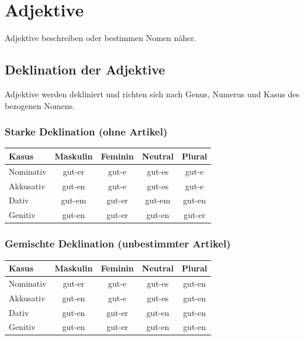 \chapter{Adjektive}
\label{cha:Adjektive}

Adjektive beschreiben oder bestimmen Nomen näher.

\section{Deklination der Adjektive}
\label{sec:AdjDeklination}

Adjektive werden dekliniert und richten sich nach Genus, Numerus und Kasus des bezogenen Nomens.

\subsection{Starke Deklination (ohne Artikel)}
\begin{center}
\begin{tabular}{|l|c|c|c|c|}
\hline
\textbf{Kasus} & \textbf{Maskulin} & \textbf{Feminin} & \textbf{Neutral} & \textbf{Plural} \\ \hline
Nominativ & gut-er & gut-e & gut-es & gut-e \\ \hline
Akkusativ & gut-en & gut-e & gut-es & gut-e \\ \hline
Dativ & gut-em & gut-er & gut-em & gut-en \\ \hline
Genitiv & gut-en & gut-er & gut-en & gut-er \\ \hline
\end{tabular}
\end{center}

\subsection{Gemischte Deklination (unbestimmter Artikel)}
\begin{center}
\begin{tabular}{|l|c|c|c|c|}
\hline
\textbf{Kasus} & \textbf{Maskulin} & \textbf{Feminin} & \textbf{Neutral} & \textbf{Plural} \\ \hline
Nominativ & gut-er & gut-e & gut-es & gut-en \\ \hline
Akkusativ & gut-en & gut-e & gut-es & gut-en \\ \hline
Dativ & gut-en & gut-er & gut-en & gut-en \\ \hline
Genitiv & gut-en & gut-er & gut-en & gut-en \\ \hline
\end{tabular}
\end{center}

